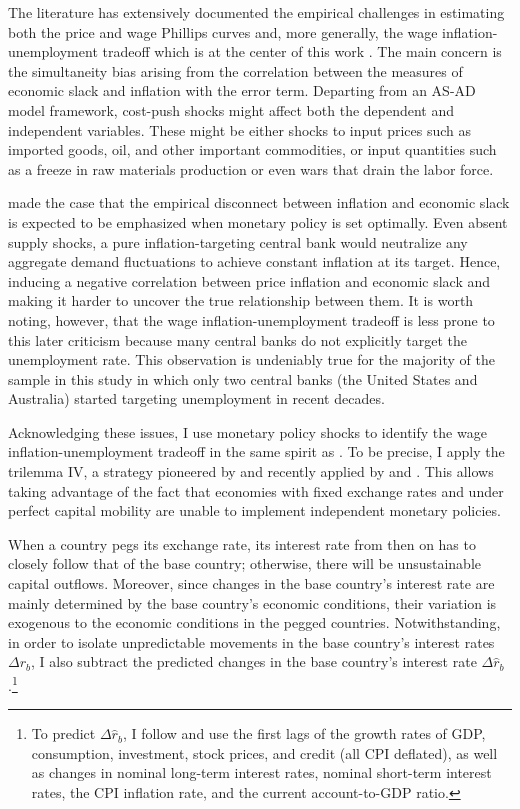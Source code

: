 \documentclass[12pt]{article}
\begin{document}
The literature has extensively documented the empirical challenges in estimating both the price and wage Phillips curves \citep{Gali2011, Mavroeidis2014, Mcleay2019} and, more generally, the wage inflation-unemployment tradeoff which is at the center of this work \citep{Barnichon2019, Gali2019}. The main concern is the simultaneity bias arising from the correlation between the measures of economic slack and inflation with the error term. Departing from an AS-AD model framework, cost-push shocks might affect both the dependent and independent variables. These might be either shocks to input prices such as imported goods, oil, and other important commodities, or input quantities such as a freeze in raw materials production or even wars that drain the labor force. 

\cite{Mcleay2019} made the case that the empirical disconnect between inflation and economic slack is expected to be emphasized when monetary policy is set optimally. Even absent supply shocks, a pure inflation-targeting central bank would neutralize any aggregate demand fluctuations to achieve constant inflation at its target. Hence, inducing a negative correlation between price inflation and economic slack and making it harder to uncover the true relationship between them. It is worth noting, however, that the wage inflation-unemployment tradeoff is less prone to this later criticism because many central banks do not explicitly target the unemployment rate. This observation is undeniably true for the majority of the sample in this study in which only two central banks (the United States and Australia) started targeting unemployment in recent decades.
 
Acknowledging these issues, I use monetary policy shocks to identify the wage inflation-unemployment tradeoff in the same spirit as \cite{Jorda2018}. To be precise, I apply the trilemma IV, a strategy pioneered by \cite{DiGiovanni2009} and recently applied by \cite{Jorda2019} and \cite{Schularick2020}. This allows taking advantage of the fact that economies with fixed exchange rates and under perfect capital mobility are unable to implement independent monetary policies. %

When a country pegs its exchange rate, its interest rate from then on has to closely follow that of the base country; otherwise, there will be unsustainable capital outflows. Moreover, since changes in the base country's interest rate are mainly determined by the base country's economic conditions, their variation is exogenous to the economic conditions in the pegged countries. Notwithstanding, in order to isolate unpredictable movements in the base country's interest rates $\Delta r_b$, I also subtract the predicted changes in the base country's interest rate $\Delta \hat{r}_b$.\footnote{To predict $\Delta \hat{r}_b$, I follow \cite{Jorda2019} and use the first lags of the growth rates of GDP, consumption, investment, stock prices, and credit (all CPI deflated), as well as changes in nominal long-term interest rates, nominal short-term interest rates, the CPI inflation rate, and the current account-to-GDP ratio.}
\end{document}

